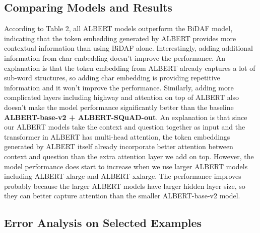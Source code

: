 \documentclass{article}
\begin{document}
\subsection{Comparing Models and Results} \label{results_analysis}
According to Table 2, all ALBERT models outperform the BiDAF model, indicating that the token embedding generated by ALBERT provides more contextual information than using BiDAF alone. Interestingly, adding additional information from char embedding doesn't improve the performance. An explanation is that the token embedding from ALBERT already captures a lot of sub-word structures, so adding char embedding is providing repetitive information and it won't improve the performance. Similarly, adding more complicated layers including highway and attention on top of ALBERT also doesn't make the model performance significantly better than the baseline \textbf{ALBERT-base-v2 + ALBERT-SQuAD-out}. An explanation is that since our ALBERT models take the context and question together as input and the transformer in ALBERT has multi-head attention, the token embeddings generated by ALBERT itself already incorporate better attention between context and question than the extra attention layer we add on top. However, the model performance does start to increase when we use larger ALBERT models including ALBERT-xlarge and ALBERT-xxlarge. The performance improves probably because the larger ALBERT models have larger hidden layer size, so they can better capture attention than the smaller ALBERT-base-v2 model. 

\subsection{Error Analysis on Selected Examples}
\end{document}
